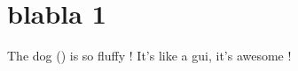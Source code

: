 \chapter{blabla 1}


The dog () is so fluffy ! It's like a \gls{gui}, it's
awesome !


\lipsum[1-20]
